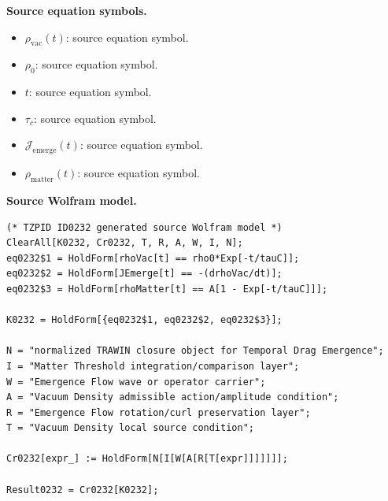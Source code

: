 \begin{minipage}[t]{0.49\linewidth}
\begingroup
\small
\raggedright
\textbf{Source equation symbols.}\par
\begin{itemize}[leftmargin=1.35em,itemsep=1pt,topsep=1pt,parsep=0pt]
    \item $\rho_{\mathrm{vac}}(t)$: source equation symbol.
    \item $\rho_0$: source equation symbol.
    \item $t$: source equation symbol.
    \item $\tau_c$: source equation symbol.
    \item $\mathcal{J}_{\mathrm{emerge}}(t)$: source equation symbol.
    \item $\rho_{\mathrm{matter}}(t)$: source equation symbol.
\end{itemize}
\endgroup
\end{minipage}\hfill
\begin{minipage}[t]{0.47\linewidth}
\begingroup
\scriptsize
\raggedright
\textbf{Source Wolfram model.}\par
\begin{Verbatim}[fontsize=\tiny,breaklines=true,breakanywhere=true]
(* TZPID ID0232 generated source Wolfram model *)
ClearAll[K0232, Cr0232, T, R, A, W, I, N];
eq0232$1 = HoldForm[rhoVac[t] == rho0*Exp[-t/tauC]];
eq0232$2 = HoldForm[JEmerge[t] == -(drhoVac/dt)];
eq0232$3 = HoldForm[rhoMatter[t] == A[1 - Exp[-t/tauC]]];

K0232 = HoldForm[{eq0232$1, eq0232$2, eq0232$3}];

N = "normalized TRAWIN closure object for Temporal Drag Emergence";
I = "Matter Threshold integration/comparison layer";
W = "Emergence Flow wave or operator carrier";
A = "Vacuum Density admissible action/amplitude condition";
R = "Emergence Flow rotation/curl preservation layer";
T = "Vacuum Density local source condition";

Cr0232[expr_] := HoldForm[N[I[W[A[R[T[expr]]]]]]];

Result0232 = Cr0232[K0232];
\end{Verbatim}
\endgroup
\end{minipage}

